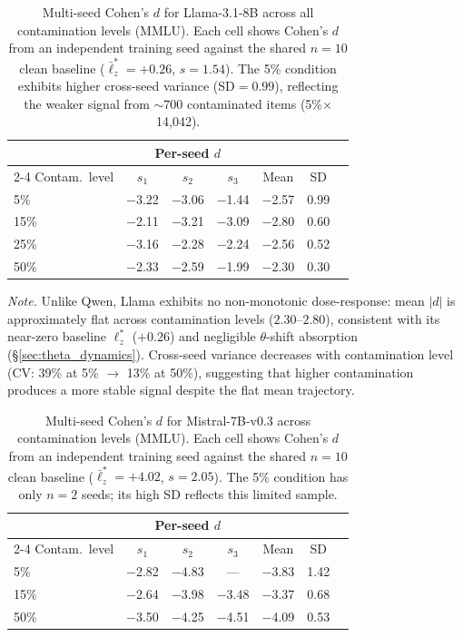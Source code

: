 \begin{table}[h]
\centering
\caption{Multi-seed Cohen's $d$ for Llama-3.1-8B across all contamination levels (MMLU). Each cell shows Cohen's $d$ from an independent training seed against the shared $n{=}10$ clean baseline ($\bar{\ell}_z^* = {+}0.26$, $s = 1.54$). The 5\% condition exhibits higher cross-seed variance (SD${=}0.99$), reflecting the weaker signal from ${\sim}700$ contaminated items (5\%$\times$14{,}042).}
\label{tab:llama_multiseed}
\footnotesize
\begin{tabular}{@{}lcccccc@{}}
\toprule
& \multicolumn{3}{c}{Per-seed $d$} & & \\
\cmidrule(lr){2-4}
Contam.\ level & $s_1$ & $s_2$ & $s_3$ & Mean & SD \\
\midrule
5\%  & $-$3.22 & $-$3.06 & $-$1.44 & $-$2.57 & 0.99 \\
15\% & $-$2.11 & $-$3.21 & $-$3.09 & $-$2.80 & 0.60 \\
25\% & $-$3.16 & $-$2.28 & $-$2.24 & $-$2.56 & 0.52 \\
50\% & $-$2.33 & $-$2.59 & $-$1.99 & $-$2.30 & 0.30 \\
\bottomrule
\end{tabular}
\vspace{0.5em}

\noindent\textit{Note.} Unlike Qwen, Llama exhibits no non-monotonic dose-response: mean $|d|$ is approximately flat across contamination levels ($2.30$--$2.80$), consistent with its near-zero baseline $\ell_z^*$ ($+0.26$) and negligible $\theta$-shift absorption (\S\ref{sec:theta_dynamics}). Cross-seed variance decreases with contamination level (CV: 39\% at 5\% $\to$ 13\% at 50\%), suggesting that higher contamination produces a more stable signal despite the flat mean trajectory.
\end{table}

\begin{table}[h]
\centering
\caption{Multi-seed Cohen's $d$ for Mistral-7B-v0.3 across contamination levels (MMLU). Each cell shows Cohen's $d$ from an independent training seed against the shared $n{=}10$ clean baseline ($\bar{\ell}_z^* = {+}4.02$, $s = 2.05$). The 5\% condition has only $n{=}2$ seeds; its high SD reflects this limited sample.}
\label{tab:mistral_multiseed}
\footnotesize
\begin{tabular}{@{}lcccccc@{}}
\toprule
& \multicolumn{3}{c}{Per-seed $d$} & & \\
\cmidrule(lr){2-4}
Contam.\ level & $s_1$ & $s_2$ & $s_3$ & Mean & SD \\
\midrule
5\%  & $-$2.82 & $-$4.83 & --- & $-$3.83 & 1.42 \\
15\% & $-$2.64 & $-$3.98 & $-$3.48 & $-$3.37 & 0.68 \\
50\% & $-$3.50 & $-$4.25 & $-$4.51 & $-$4.09 & 0.53 \\
\bottomrule
\end{tabular}
\end{table}

